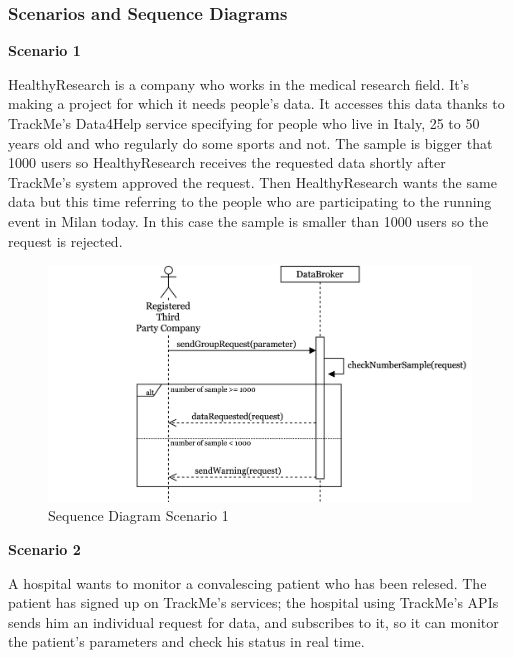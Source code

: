 \documentclass[../main.tex]{subfiles}
\begin{document}
	\subsubsection{Scenarios and Sequence Diagrams}
		\begin{minipage}{\textwidth}
			{\bf Scenario 1}
			\vspace{3mm}

			HealthyResearch is a company who works in the medical research field. It's making a project for which it needs people's data. It accesses this data thanks to TrackMe's Data4Help service specifying for people who live in Italy, 25 to 50 years old and who regularly do some sports and not. The sample is bigger that 1000 users so HealthyResearch receives the requested data shortly after TrackMe's system approved the request.
			Then HealthyResearch wants the same data but this time referring to the people who are participating to the running event in Milan today. In this case the sample is smaller than 1000 users so the request is rejected.

			\vspace{5mm}
		\end{minipage}
		\begin{figure}[H]
			\centering
			\includegraphics[scale=.3]{images/sequenceDiagram1.png}
			\caption{Sequence Diagram Scenario 1 \label{fig:Sequence Diagram Scenario 1}}
		\end{figure}
		\begin{minipage}{\textwidth}
			{\bf Scenario 2}
			\vspace{3mm}

			A hospital wants to monitor a convalescing patient who has been relesed. The patient has signed up on TrackMe's services; the hospital using TrackMe's APIs sends him an individual request for data, and subscribes to it, so it can monitor the patient's parameters and check his status in real time.
			\vspace{5mm}
		\end{minipage}
\end{document}
